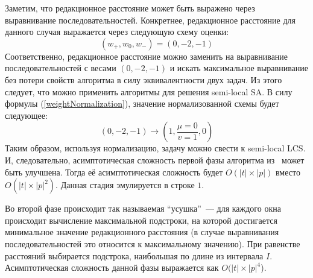 Заметим, что редакционное расстояние может быть выражено через выравнивание последовательностей.
Конкретнее, редакционное расстояние для данного случая выражается через следующую схему оценки:
\begin{equation}\label{weightAppr}
    (w_{+},w_{0},w_{-}) = (0,-2,-1)
\end{equation}
Соответственно, редакционное расстояние можно заменить на выравнивание последовательностей с весами $(0,-2,-1)$ и искать максимальное выравнивание без потери свойств алгоритма в силу эквивалентности двух задач.
Из этого следует, что можно применить алгоритмы для решения {semi-local SA}.
В силу  формулы (\ref{weightNormalization}), значение нормализованной схемы будет следующее:
\begin{equation}
    (0, -2, -1) \rightarrow (1,\dfrac{\mu=0}{v=1}, 0)
\end{equation}
Таким образом, используя нормализацию, задачу можно свести к {semi-local LCS}.
И, следовательно, асимптотическая сложность первой фазы алгоритма  из~\cite{luciv2019interactive} может быть улучшена. Тогда её асимптотическая сложность будет $O(|t| \times |p|)$ вместо $O(|t| \times |p|^2)$.
Данная стадия эмулируется в строке $1$.

Во второй фазе происходит так называемая ``усушка''~--- для каждого окна происходит вычисление максимальной подстроки, на которой достигается минимальное значение редакционного расстояния (в случае выравнивания последовательностей это относится к максимальному значению).
При равенстве расстояний выбирается подстрока, наибольшая по длине из интервала $I$.
Асимптотическая сложность данной фазы выражается как $O(|t| \times |p|^4$).

